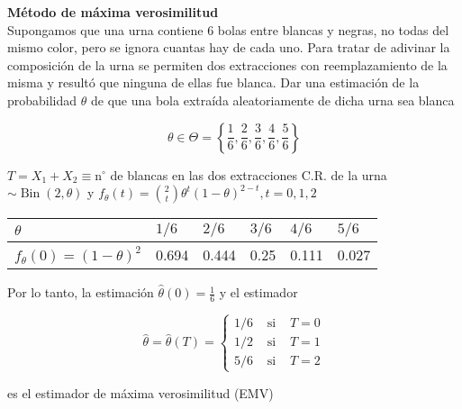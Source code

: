 
\textbf{Método de máxima verosimilitud}\\
Supongamos que una urna contiene 6 bolas entre blancas y negras, no todas del mismo color, pero se ignora cuantas hay de cada uno. Para tratar de adivinar la composición de la urna se permiten dos extracciones con reemplazamiento de la misma y resultó que ninguna de ellas fue blanca. Dar una estimación de la probabilidad $\theta$ de que una bola extraída aleatoriamente de dicha urna sea blanca

$$
  \theta \in \Theta=\left\{\frac{1}{6}, \frac{2}{6}, \frac{3}{6}, \frac{4}{6}, \frac{5}{6}\right\}
$$

$T=X_{1}+X_{2} \equiv \mathrm{n}^{\circ}$ de blancas en las dos extracciones C.R. de la urna $\sim \operatorname{Bin}(2, \theta)$ y $f_{\theta}(t)=\binom{2}{t} \theta^{t}(1-\theta)^{2-t}, t=0,1,2$

\begin{center}
  \begin{tabular}{|l|l|l|l|l|l|}
    \hline
    $\theta$                       & $1 / 6$ & $2 / 6$ & $3 / 6$ & $4 / 6$ & $5 / 6$ \\
    \hline
    $f_{\theta}(0)=(1-\theta)^{2}$ & 0.694   & 0.444   & 0.25    & 0.111   & 0.027   \\
    \hline
  \end{tabular}
\end{center}

Por lo tanto, la estimación $\hat{\theta}(0)=\frac{1}{6}$ y el estimador

$$
  \hat{\theta}=\hat{\theta}(T)=\left\{\begin{array}{lll}
    1 / 6 & \text { si } & T=0 \\
    1 / 2 & \text { si } & T=1 \\
    5 / 6 & \text { si } & T=2
  \end{array}\right.
$$

es el estimador de máxima verosimilitud (EMV)

